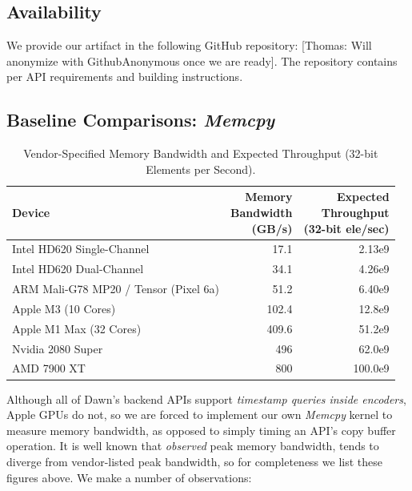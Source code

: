 \documentclass[sigconf]{acmart}
\newcommand{\thomas}[1]{{\footnotesize\color{orange}[Thomas: #1]}}
\begin{document}
\subsection{Availability}
We provide our artifact in the following GitHub repository: \thomas{Will anonymize with GithubAnonymous once we are ready}. The repository contains per API requirements and building instructions.

\subsection{Baseline Comparisons: \emph{Memcpy}}%
\label{sec:memcpy}
\begin{table}
  \small
  \centering
  \begin{tabular}{l r r}
    \toprule
    Device                                & \makecell{Memory                   \\ Bandwidth \\ (GB/s)} & \makecell{Expected \\ Throughput \\ (32-bit ele/sec)} \\
    \midrule
    Intel HD620 Single-Channel            & 17.1             & 2.13e9          \\
    Intel HD620 Dual-Channel              & 34.1             & 4.26e9          \\
    ARM Mali-G78 MP20 / Tensor (Pixel 6a) & 51.2             & 6.40e9          \\
    Apple M3 (10 Cores)                   & 102.4            & 12.8e9          \\
    Apple M1 Max (32 Cores)               & 409.6            & 51.2e9          \\
    Nvidia 2080 Super                     & 496              & 62.0e9          \\
    AMD 7900 XT                           & 800              & 100.0e9         \\
    \bottomrule
  \end{tabular}
  \caption{Vendor-Specified Memory Bandwidth and Expected Throughput (32-bit Elements per Second).\label{tab:memory_bandwidth}}
\end{table}
Although all of Dawn's backend APIs support \emph{timestamp queries inside encoders}, Apple GPUs do not, so we are forced to implement our own \emph{Memcpy} kernel to measure memory bandwidth, as opposed to simply timing an API's copy buffer operation. It is well known that \emph{observed} peak memory bandwidth, tends to diverge from vendor-listed peak bandwidth, so for completeness we list these figures above. We make a number of observations:
\end{document}
